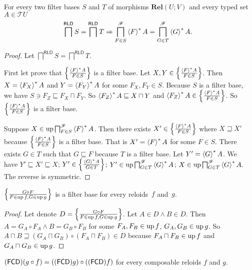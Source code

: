 \begin{lem}
\label{base-intrs-lem}For every two filter bases $S$ and $T$ of
morphisms $\mathbf{Rel}(U;V)$ and every typed set $A\in\mathscr{T}U$
\[
\bigsqcap^{\mathsf{RLD}}S=\bigsqcap^{\mathsf{RLD}}T\Rightarrow\bigsqcap_{F\in S}^{\mathscr{F}}\left\langle F\right\rangle ^{\ast}A=\bigsqcap_{G\in T}^{\mathscr{F}}\left\langle G\right\rangle ^{\ast}A.
\]
\end{lem}
\begin{proof}
Let $\bigsqcap^{\mathsf{RLD}}S=\bigsqcap^{\mathsf{RLD}}T$.

First let prove that $\left\{ \frac{\left\langle F\right\rangle ^{\ast}A}{F\in S}\right\}$ is a filter
base. Let $X,Y\in\left\{ \frac{\left\langle F\right\rangle ^{\ast}A}{F\in S}\right\}$. Then $X=\left\langle F_{X}\right\rangle ^{\ast}A$
and $Y=\left\langle F_{Y}\right\rangle ^{\ast}A$ for some $F_{X},F_{Y}\in S$. Because $S$
is a filter base, we have $S\ni F_{Z}\sqsubseteq F_{X}\sqcap F_{Y}$.
So $\left\langle F_{Z}\right\rangle ^{\ast}A\sqsubseteq X\sqcap Y$ and $\left\langle F_{Z}\right\rangle ^{\ast}A\in\left\{ \frac{\left\langle F\right\rangle ^{\ast}A}{F\in S}\right\}$.
So $\left\{ \frac{\left\langle F\right\rangle ^{\ast}A}{F\in S}\right\}$ is a filter base.

Suppose $X\in\operatorname{up}\bigsqcap_{F\in S}^{\mathscr{F}}\left\langle F\right\rangle ^{\ast}A$. Then there
exists $X'\in\left\{ \frac{\left\langle F\right\rangle ^{\ast}A}{F\in S}\right\}$ where $X\sqsupseteq X'$
because $\left\{ \frac{\left\langle F\right\rangle ^{\ast}A}{F\in S}\right\}$ is a filter base. That is
$X'=\left\langle F\right\rangle ^{\ast}A$ for some $F\in S$. There exists $G\in T$ such
that $G\sqsubseteq F$ because $T$ is a filter base. Let $Y'=\left\langle G\right\rangle ^{\ast}A$.
We have $Y'\sqsubseteq X'\sqsubseteq X$; $Y'\in\left\{ \frac{\left\langle G\right\rangle ^{\ast}A}{G\in T}\right\}$;
$Y'\in\operatorname{up}\bigsqcap_{G\in T}^{\mathscr{F}}\left\langle G\right\rangle ^{\ast}A$; $X\in\operatorname{up}\bigsqcap_{G\in T}^{\mathscr{F}}\left\langle G\right\rangle ^{\ast}A.$
The reverse is symmetric.\end{proof}
\begin{lem}
$\left\{ \frac{G\circ F}{F\in\operatorname{up} f,G\in\operatorname{up} g}\right\}$ is a filter base for every
reloids~$f$ and~$g$.\end{lem}
\begin{proof}
Let denote $D=\left\{ \frac{G\circ F}{F\in\operatorname{up} f,G\in\operatorname{up} g}\right\}$. Let $A\in D\land B\in D$.
Then $A=G_{A}\circ F_{A}\land B=G_{B}\circ F_{B}$ for some $F_{A},F_{B}\in\operatorname{up} f$,
$G_{A},G_{B}\in\operatorname{up} g$. So $A\sqcap B\sqsupseteq(G_{A}\sqcap G_{B})\circ(F_{A}\sqcap F_{B})\in D$
because $F_{A}\sqcap F_{B}\in\operatorname{up} f$ and $G_{A}\sqcap G_{B}\in\operatorname{up} g$.\end{proof}
\begin{thm}
$(\mathsf{FCD})(g\circ f)=((\mathsf{FCD}) g)\circ((\mathsf{FCD}) f)$ for every composable
reloids $f$ and $g$.\end{thm}
